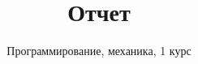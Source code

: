 ﻿\thispagestyle{empty}
 
\title{Отчет}
\author{Программирование, механика, 1 курс}
\maketitle

\tableofcontents

\newpage

\listoffigures